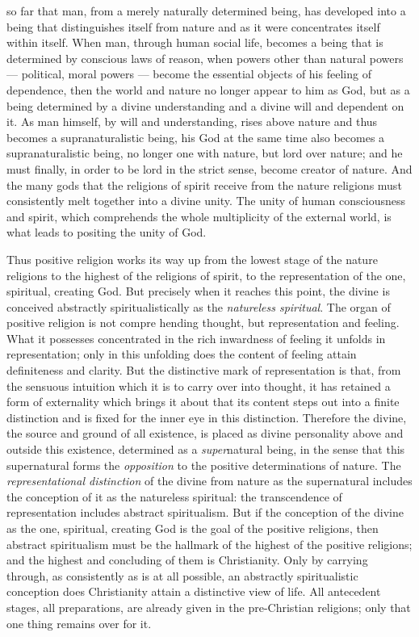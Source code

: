 \documentclass[12pt,a4paper,openany]{book}
\newcommand{\opage}[1]{\marginnote{\footnotesize\textit{[#1]}}}
\begin{document}
so far that man, from a merely naturally determined being,
has developed into a being that distinguishes itself from nature and
as it were concentrates itself within itself. When man, through
human social life, becomes a being that is determined
by conscious laws of reason, when powers other than
natural powers --- political, moral powers --- become the essential
objects of his feeling of dependence, then the world and
nature no longer appear to him as God, but as a being determined by
a divine understanding and a divine will
and dependent on it. As man himself, by will
and understanding, rises above nature and thus becomes a
supranaturalistic being, his God at the same time also becomes
a supranaturalistic being, no longer one with nature,
but lord over nature; and he must finally, in order
to be lord in the strict sense, become creator of nature.
And the many gods that the religions of spirit receive from
the nature religions must consistently melt together into a divine
unity. The unity of human consciousness and spirit,
which comprehends the whole multiplicity of the external world,
is what leads to positing the unity of God.

Thus positive religion works its way up from
the lowest stage of the nature religions to the highest of the religions of spirit,
to the representation of the one, spiritual, creating God. But
precisely when it reaches this point, the divine is
conceived abstractly spiritualistically as the \emph{natureless spiritual}.
The organ of positive religion is not compre%
\opage{449}hending thought, but representation and feeling. What it possesses
concentrated in the rich inwardness of feeling it
unfolds in representation; only in this unfolding does
the content of feeling attain definiteness and clarity. But the distinctive mark
of representation is that, from the sensuous intuition which
it is to carry over into thought, it has retained a form of externality
which brings it about that its content steps out into a finite
distinction and is fixed for the inner eye in this distinction.
Therefore the divine, the source and
ground of all existence, is placed as divine personality above and outside
this existence, determined as a \emph{super}natural being, in the
sense that this supernatural forms the \emph{opposition}
to the positive determinations of nature. The \emph{representational distinction}
of the divine from nature as the supernatural
includes the conception of it as the natureless spiritual:
the transcendence of representation includes abstract spiritualism.
But if the conception of the divine as
the one, spiritual, creating God is the goal of the positive religions,
then abstract spiritualism must be
the hallmark of the highest of the positive religions;
and the highest and concluding of them is Christianity.
Only by carrying through, as consistently as is at all possible,
an abstractly spiritualistic conception does
Christianity attain a distinctive view of life. All antecedent
stages, all preparations, are already given in the
pre-Christian religions; only that one thing remains over for it.
\end{document}
